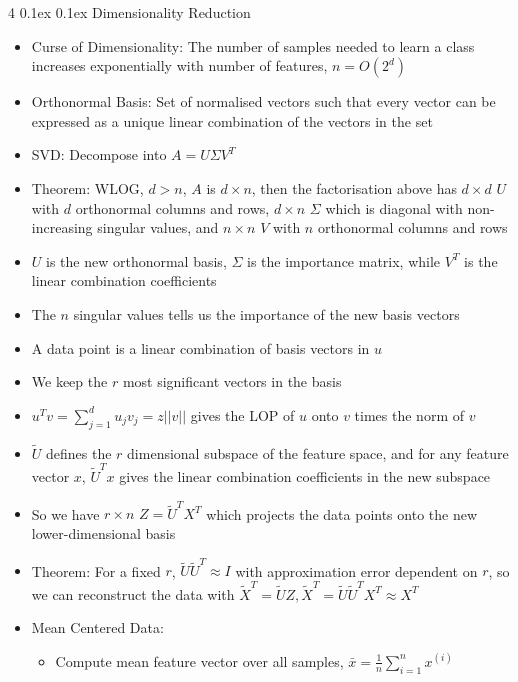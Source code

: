 \documentclass[10pt, landscape]{article}
\makeatletter
\renewcommand{\subsection}{\@startsection{subsection}{2}{0mm}%
  {0.1ex} %
  {0.1ex} %
  {\normalfont\normalsize\bfseries}}
\makeatother
\begin{document}
\begin{multicols*}{4}
\subsection{Dimensionality Reduction}
\begin{itemize}
    \item Curse of Dimensionality: The number of samples needed to learn a class increases exponentially with number of features, $n=O(2^d)$
    \item Orthonormal Basis: Set of normalised vectors such that every vector can be expressed as a unique linear combination of the vectors in the set
    \item SVD: Decompose into $A=U\Sigma V^T$
    \item Theorem: WLOG, $d > n$, $A$ is $d \times n$, then the factorisation above has $d \times d$ $U$ with $d$ orthonormal columns and rows, $d \times n$ $\Sigma$ which is diagonal with non-increasing singular values, and $n \times n$ $V$ with $n$ orthonormal columns and rows
    \item $U$ is the new orthonormal basis, $\Sigma$ is the importance matrix, while $V^T$ is the linear combination coefficients
    \item The $n$ singular values tells us the importance of the new basis vectors
    \item A data point is a linear combination of basis vectors in $u$
    \item We keep the $r$ most significant vectors in the basis
    \item $u^Tv=\sum_{j=1}^du_jv_j=z||v||$ gives the LOP of $u$ onto $v$ times the norm of $v$
    \item $\tilde{U}$ defines the $r$ dimensional subspace of the feature space, and for any feature vector $x$, $\tilde{U}^Tx$ gives the linear combination coefficients in the new subspace
    \item So we have $r \times n$ $Z=\tilde{U}^TX^T$ which projects the data points onto the new lower-dimensional basis
    \item Theorem: For a fixed $r$, $\tilde{U}\tilde{U}^T\approx I$ with approximation error dependent on $r$, so we can reconstruct the data with $\tilde{X}^T=\tilde{U}Z, \tilde{X}^T=\tilde{U}\tilde{U}^TX^T\approx X^T$
    \item Mean Centered Data:
    \begin{itemize}
        \item Compute mean feature vector over all samples, $\bar{x} = \frac{1}{n}\sum_{i=1}^n x^{(i)}$

\end{itemize}
\end{itemize}
\end{multicols*}
\end{document}
